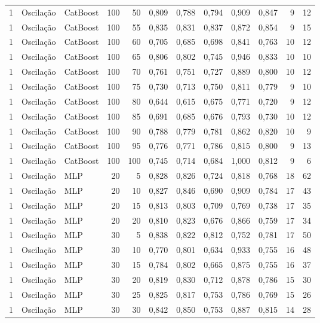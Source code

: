 \begin{longtable}{@{}rllrrrrrrrrr@{}}
1 & Oscilação & CatBoost & 100 & 50 & 0,809 & 0,788 & 0,794 & 0,909 & 0,847 & 9 & 12 \\
1 & Oscilação & CatBoost & 100 & 55 & 0,835 & 0,831 & 0,837 & 0,872 & 0,854 & 9 & 15 \\
1 & Oscilação & CatBoost & 100 & 60 & 0,705 & 0,685 & 0,698 & 0,841 & 0,763 & 10 & 12 \\
1 & Oscilação & CatBoost & 100 & 65 & 0,806 & 0,802 & 0,745 & 0,946 & 0,833 & 10 & 10 \\
1 & Oscilação & CatBoost & 100 & 70 & 0,761 & 0,751 & 0,727 & 0,889 & 0,800 & 10 & 12 \\
1 & Oscilação & CatBoost & 100 & 75 & 0,730 & 0,713 & 0,750 & 0,811 & 0,779 & 9 & 10 \\
1 & Oscilação & CatBoost & 100 & 80 & 0,644 & 0,615 & 0,675 & 0,771 & 0,720 & 9 & 12 \\
1 & Oscilação & CatBoost & 100 & 85 & 0,691 & 0,685 & 0,676 & 0,793 & 0,730 & 10 & 12 \\
1 & Oscilação & CatBoost & 100 & 90 & 0,788 & 0,779 & 0,781 & 0,862 & 0,820 & 10 & 9 \\
1 & Oscilação & CatBoost & 100 & 95 & 0,776 & 0,771 & 0,786 & 0,815 & 0,800 & 9 & 13 \\
1 & Oscilação & CatBoost & 100 & 100 & 0,745 & 0,714 & 0,684 & 1,000 & 0,812 & 9 & 6 \\
1 & Oscilação & MLP & 20 & 5 & 0,828 & 0,826 & 0,724 & 0,818 & 0,768 & 18 & 62 \\
1 & Oscilação & MLP & 20 & 10 & 0,827 & 0,846 & 0,690 & 0,909 & 0,784 & 17 & 43 \\
1 & Oscilação & MLP & 20 & 15 & 0,813 & 0,803 & 0,709 & 0,769 & 0,738 & 17 & 35 \\
1 & Oscilação & MLP & 20 & 20 & 0,810 & 0,823 & 0,676 & 0,866 & 0,759 & 17 & 34 \\
1 & Oscilação & MLP & 30 & 5 & 0,838 & 0,822 & 0,812 & 0,752 & 0,781 & 17 & 50 \\
1 & Oscilação & MLP & 30 & 10 & 0,770 & 0,801 & 0,634 & 0,933 & 0,755 & 16 & 48 \\
1 & Oscilação & MLP & 30 & 15 & 0,784 & 0,802 & 0,665 & 0,875 & 0,755 & 16 & 37 \\
1 & Oscilação & MLP & 30 & 20 & 0,819 & 0,830 & 0,712 & 0,878 & 0,786 & 15 & 30 \\
1 & Oscilação & MLP & 30 & 25 & 0,825 & 0,817 & 0,753 & 0,786 & 0,769 & 15 & 26 \\
1 & Oscilação & MLP & 30 & 30 & 0,842 & 0,850 & 0,753 & 0,887 & 0,815 & 14 & 28 \\

\end{longtable}
